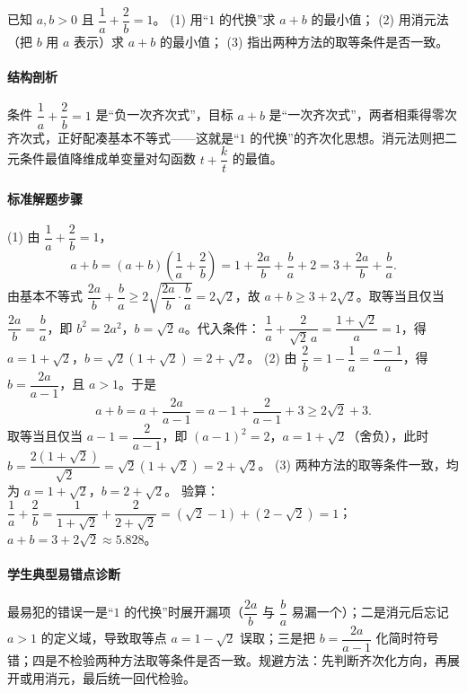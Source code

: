 \begin{problem}
已知 $a,b>0$ 且 $\dfrac1a+\dfrac2b=1$。
(1) 用“$1$ 的代换”求 $a+b$ 的最小值；
(2) 用消元法（把 $b$ 用 $a$ 表示）求 $a+b$ 的最小值；
(3) 指出两种方法的取等条件是否一致。
\end{problem}
\begin{solution}
\paragraph{结构剖析}
条件 $\dfrac1a+\dfrac2b=1$ 是“负一次齐次式”，目标 $a+b$ 是“一次齐次式”，两者相乘得零次齐次式，正好配凑基本不等式——这就是“$1$ 的代换”的齐次化思想。消元法则把二元条件最值降维成单变量对勾函数 $t+\dfrac{k}{t}$ 的最值。
\paragraph{标准解题步骤}
(1) 由 $\dfrac1a+\dfrac2b=1$，
$$a+b=(a+b)\left(\frac1a+\frac2b\right)=1+\frac{2a}b+\frac ba+2=3+\frac{2a}b+\frac ba.$$
由基本不等式 $\dfrac{2a}b+\dfrac ba\ge2\sqrt{\dfrac{2a}b\cdot\dfrac ba}=2\sqrt2$，故 $a+b\ge3+2\sqrt2$。取等当且仅当 $\dfrac{2a}b=\dfrac ba$，即 $b^2=2a^2$，$b=\sqrt2\,a$。代入条件：
$\dfrac1a+\dfrac2{\sqrt2\,a}=\dfrac{1+\sqrt2}{a}=1$，得 $a=1+\sqrt2$，$b=\sqrt2(1+\sqrt2)=2+\sqrt2$。
(2) 由 $\dfrac2b=1-\dfrac1a=\dfrac{a-1}{a}$，得 $b=\dfrac{2a}{a-1}$，且 $a>1$。于是
$$a+b=a+\frac{2a}{a-1}=a-1+\frac{2}{a-1}+3\ge2\sqrt2+3.$$
取等当且仅当 $a-1=\dfrac{2}{a-1}$，即 $(a-1)^2=2$，$a=1+\sqrt2$（舍负），此时 $b=\dfrac{2(1+\sqrt2)}{\sqrt2}=\sqrt2(1+\sqrt2)=2+\sqrt2$。
(3) 两种方法的取等条件一致，均为 $a=1+\sqrt2$，$b=2+\sqrt2$。
验算：$\dfrac1a+\dfrac2b=\dfrac1{1+\sqrt2}+\dfrac2{2+\sqrt2}=(\sqrt2-1)+(2-\sqrt2)=1$；$a+b=3+2\sqrt2\approx5.828$。
\paragraph{学生典型易错点诊断}
最易犯的错误一是“$1$ 的代换”时展开漏项（$\dfrac{2a}b$ 与 $\dfrac ba$ 易漏一个）；二是消元后忘记 $a>1$ 的定义域，导致取等点 $a=1-\sqrt2$ 误取；三是把 $b=\dfrac{2a}{a-1}$ 化简时符号错；四是不检验两种方法取等条件是否一致。规避方法：先判断齐次化方向，再展开或用消元，最后统一回代检验。
\end{solution}

